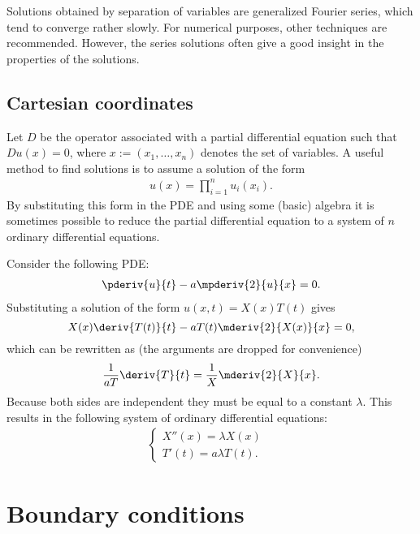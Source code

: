     \begin{remark*}
        Solutions obtained by separation of variables are generalized Fourier series, which tend to converge rather slowly. For numerical purposes, other techniques are recommended. However, the series solutions often give a good insight in the properties of the solutions.
    \end{remark*}

\subsection{Cartesian coordinates}

    \begin{method}
        Let $D$ be the operator associated with a partial differential equation such that $Du(x)=0$, where $x := (x_1,\ldots,x_n)$ denotes the set of variables. A useful method to find solutions is to assume a solution of the form
        \begin{gather}
            u(x) = \prod_{i=1}^nu_i(x_i).
        \end{gather}
        By substituting this form in the PDE and using some (basic) algebra it is sometimes possible to reduce the partial differential equation to a system of $n$ ordinary differential equations.
    \end{method}

    \begin{example}
        Consider the following PDE:
        \begin{gather}
            \pderiv{u}{t} - a\mpderiv{2}{u}{x} = 0.
        \end{gather}
        Substituting a solution of the form $u(x,t) = X(x)T(t)$ gives \[X(x)\deriv{T(t)}{t} - aT(t)\mderiv{2}{X(x)}{x} = 0,\] which can be rewritten as (the arguments are dropped for convenience) \[\frac{1}{aT}\deriv{T}{t} = \frac{1}{X}\mderiv{2}{X}{x}.\] Because both sides are independent they must be equal to a constant $\lambda$. This results in the following system of ordinary differential equations:
        \begin{gather}
            \begin{cases}
                X''(x) = \lambda X(x)&\\
                T'(t) = a\lambda T(t).&
            \end{cases}
        \end{gather}
    \end{example}

\section{Boundary conditions}

